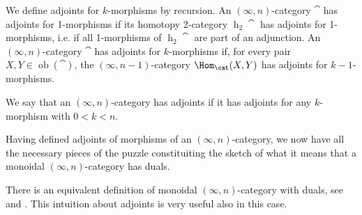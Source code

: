   \begin{defn}
We define adjoints for $k$-morphisms by recursion.
An $(\infty,n)$-category $\cat$ has adjoints for 1-morphisms if its homotopy 2-category 
$\operatorname{h}_2\cat$ has adjoints for 1-morphisms, i.e. if all 1-morphisms of
 $\operatorname{h}_2\cat$ are part of an adjunction. An $(\infty,n)$-category $\cat$ has
  adjoints for $k$-morphisms if, for every pair $X,Y\in\operatorname{ob}(\cat)$, the 
  $(\infty,n-1)$-category $\Hom_{\cat}(X,Y)$ has adjoints for $k-1$-morphisms.
  \end{defn}
  We say that an $(\infty,n)$-category has adjoints if it has adjoints for any $k$-morphism 
  with $0<k<n$. 
  
  Having defined adjoints of morphisms of an $(\infty,n)$-category, we now have all the
  necessary pieces of the puzzle constituiting the sketch
   of what it means that a monoidal $(\infty,n)$-category
  has duals.
\begin{rem}
There is an equivalent definition of monoidal $(\infty,n)$-category with duals, see \cite{lurie2009classification} and
\cite{gwilliam2018duals}. This intuition about adjoints is very useful also in this case.
\end{rem}